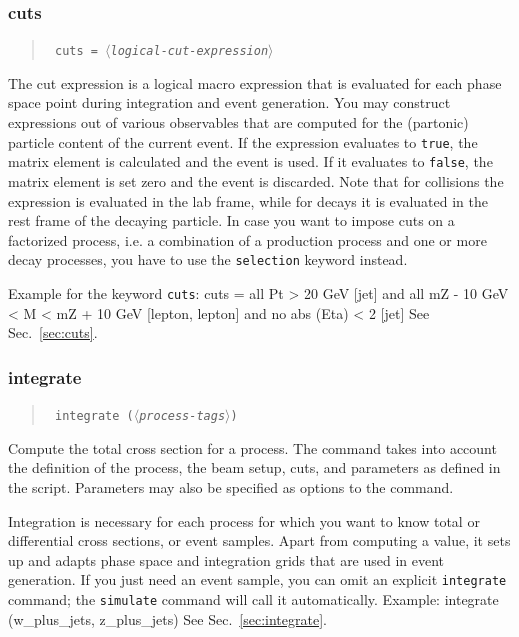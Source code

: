\documentclass[12pt]{book}
\newenvironment{code}%
  {\begingroup\footnotesize
   \quote
   \Verbatim}%
  {\endVerbatim
   \endquote
   \endgroup\noindent}
\newenvironment{syntax}%
  {\begin{quote}
   \begin{flushleft}\tt}%
  {\end{flushleft}
   \end{quote}}
\newcommand{\var}[1]{$\langle$\textit{#1}$\rangle$}
\newcommand{\ttt}[1]{\texttt{#1}}
\begin{document}
\subsubsection{cuts}
\begin{syntax}
cuts = \var{logical-cut-expression}
\end{syntax}
The cut expression is a logical macro expression that is evaluated for each
phase space point during integration and event generation.  You may construct
expressions out of various observables that are computed for the (partonic)
particle content of the current event.  If the expression evaluates to
\verb|true|, the matrix element is calculated and the event is used.  If it
evaluates to \verb|false|, the matrix element is set zero and the event is
discarded. Note that for collisions the expression is evaluated in the
lab frame, while for decays it is evaluated in the rest frame of the
decaying particle.  In case you want to impose cuts on a factorized
process, i.e. a combination of a production process and one or more
decay processes, you have to use the \ttt{selection} keyword
instead.

Example for the keyword \ttt{cuts}:
\begin{code}
cuts = all Pt > 20 GeV [jet]
  and  all mZ - 10 GeV < M < mZ + 10 GeV [lepton, lepton]
  and  no  abs (Eta) < 2 [jet]
\end{code}
See Sec.~\ref{sec:cuts}.


\subsubsection{integrate}
\begin{syntax}
integrate (\var{process-tags})
\end{syntax}
Compute the total cross section for a process.  The command takes into account
the definition of the process, the beam setup, cuts, and parameters as defined
in the script.  Parameters may also be specified as options to the command.

Integration is necessary for each process for which you want to know total or
differential cross sections, or event samples.  Apart from computing a value,
it sets up and adapts phase space and integration grids that are used in event
generation.   If you just need an event sample, you can omit an explicit
\ttt{integrate} command; the \ttt{simulate} command will call it
automatically.  Example:
\begin{code}
integrate (w_plus_jets, z_plus_jets)
\end{code}
See Sec.~\ref{sec:integrate}.
\end{document}
